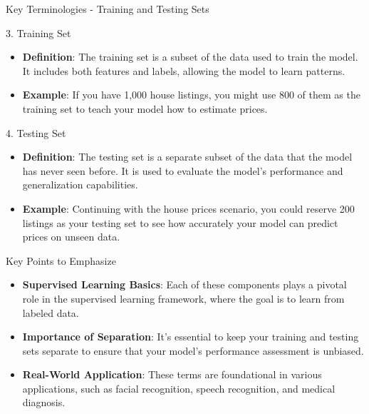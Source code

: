 \documentclass[aspectratio=169]{beamer}
\begin{document}
\begin{frame}[fragile]{Key Terminologies - Training and Testing Sets}
    \begin{block}{3. Training Set}
        \begin{itemize}
            \item \textbf{Definition}: The training set is a subset of the data used to train the model. It includes both features and labels, allowing the model to learn patterns.
            \item \textbf{Example}: If you have 1,000 house listings, you might use 800 of them as the training set to teach your model how to estimate prices.
        \end{itemize}
    \end{block}
    
    \begin{block}{4. Testing Set}
        \begin{itemize}
            \item \textbf{Definition}: The testing set is a separate subset of the data that the model has never seen before. It is used to evaluate the model's performance and generalization capabilities.
            \item \textbf{Example}: Continuing with the house prices scenario, you could reserve 200 listings as your testing set to see how accurately your model can predict prices on unseen data.
        \end{itemize}
    \end{block}
\end{frame}

\begin{frame}[fragile]{Key Points to Emphasize}
    \begin{itemize}
        \item \textbf{Supervised Learning Basics}: Each of these components plays a pivotal role in the supervised learning framework, where the goal is to learn from labeled data.
        \item \textbf{Importance of Separation}: It's essential to keep your training and testing sets separate to ensure that your model's performance assessment is unbiased.
        \item \textbf{Real-World Application}: These terms are foundational in various applications, such as facial recognition, speech recognition, and medical diagnosis.
    \end{itemize}
\end{frame}
\end{document}
